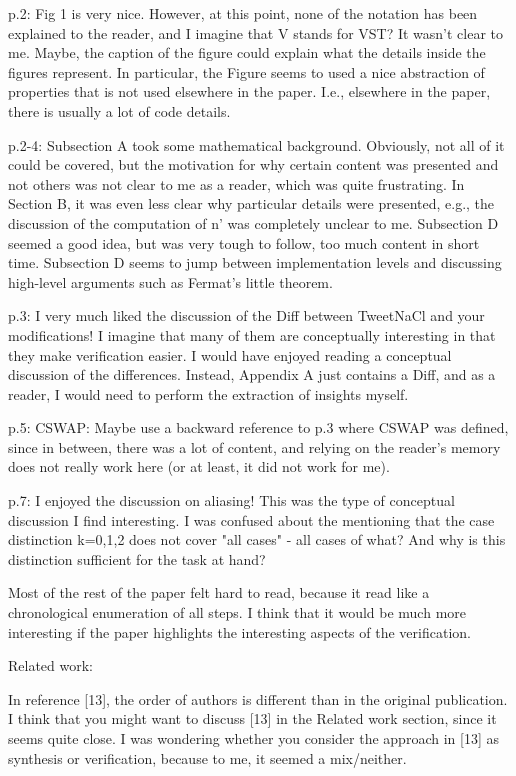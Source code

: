 p.2: Fig 1 is very nice. However, at this point, none of the notation has been
explained to the reader, and I imagine that V stands for VST? It wasn't clear to
me. Maybe, the caption of the figure could explain what the details inside the
figures represent. In particular, the Figure seems to used a nice abstraction of
properties that is not used elsewhere in the paper. I.e., elsewhere in the paper,
there is usually a lot of code details.

p.2-4: Subsection A took some mathematical background. Obviously, not all of it
could be covered, but the motivation for why certain content was presented and
not others was not clear to me as a reader, which was quite frustrating. In
Section B, it was even less clear why particular details were presented, e.g.,
the discussion of the computation of n' was completely unclear to me.
Subsection D seemed a good idea, but was very tough to follow, too much content
in short time. Subsection D seems to jump between implementation levels and
discussing high-level arguments such as Fermat's little theorem.

p.3: I very much liked the discussion of the Diff between TweetNaCl and your
modifications! I imagine that many of them are conceptually interesting in that
they make verification easier. I would have enjoyed reading a conceptual
discussion of the differences. Instead, Appendix A just contains a Diff, and as
a reader, I would need to perform the extraction of insights myself.

p.5: CSWAP: Maybe use a backward reference to p.3 where CSWAP was defined, since
in between, there was a lot of content, and relying on the reader's memory does
not really work here (or at least, it did not work for me).

p.7: I enjoyed the discussion on aliasing! This was the type of conceptual
discussion I find interesting. I was confused about the mentioning that the case
distinction k=0,1,2 does not cover "all cases" - all cases of what? And why is
this distinction sufficient for the task at hand?

Most of the rest of the paper felt hard to read, because it read like a
chronological enumeration of all steps. I think that it would be much more
interesting if the paper highlights the interesting aspects of the verification.

Related work:

In reference [13], the order of authors is different than in the original
publication. I think that you might want to discuss [13] in the Related work
section, since it seems quite close. I was wondering whether you consider the
approach in [13] as synthesis or verification, because to me, it seemed a
mix/neither.

